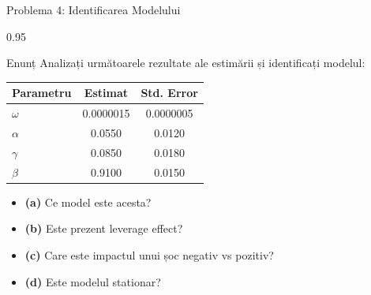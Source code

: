 \documentclass[9pt, aspectratio=169, t]{beamer}
\begin{document}
\begin{frame}{Problema 4: Identificarea Modelului}
    \begin{cminipage}{0.95\textwidth}
    \begin{block}{Enunț}
        Analizați următoarele rezultate ale estimării și identificați modelul:

        \vspace{0.3cm}
        \begin{center}
            \begin{tabular}{lcc}
                \toprule
                \textbf{Parametru} & \textbf{Estimat} & \textbf{Std. Error} \\
                \midrule
                $\omega$ & 0.0000015 & 0.0000005 \\
                $\alpha$ & 0.0550 & 0.0120 \\
                $\gamma$ & 0.0850 & 0.0180 \\
                $\beta$ & 0.9100 & 0.0150 \\
                \bottomrule
            \end{tabular}
        \end{center}

        \vspace{0.3cm}
        \begin{itemize}\setlength{\itemsep}{0pt}
            \item \textbf{(a)} Ce model este acesta?
            \item \textbf{(b)} Este prezent leverage effect?
            \item \textbf{(c)} Care este impactul unui șoc negativ vs pozitiv?
            \item \textbf{(d)} Este modelul stationar?
        \end{itemize}
    \end{block}
    \end{cminipage}
\end{frame}
\end{document}
